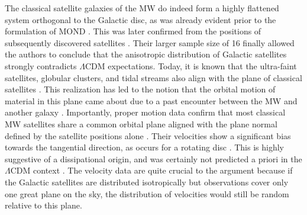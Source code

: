 \documentclass[fleqn,usenatbib,useAMS,onecolumn]{mnras} %
\begin{document}
The classical satellite galaxies of the MW do indeed form a highly flattened system orthogonal to the Galactic disc, as was already evident prior to the formulation of MOND \citep{Lynden_Bell_1976, Lynden_Bell_1982}. This was later confirmed from the positions of subsequently discovered satellites \citep{Kroupa_2005}. Their larger sample size of 16 finally allowed the authors to conclude that the anisotropic distribution of Galactic satellites strongly contradicts $\Lambda$CDM expectations. Today, it is known that the ultra-faint satellites, globular clusters, and tidal streams also align with the plane of classical satellites \citep{Pawlowski_2012}. This realization has led to the notion that the orbital motion of material in this plane came about due to a past encounter between the MW and another galaxy \citep{Pawlowski_2011}. Importantly, proper motion data confirm that most classical MW satellites share a common orbital plane \citep{Pawlowski_2013_VPOS, Pawlowski_2020} aligned with the plane normal defined by the satellite positions alone \citep{Isabel_2020}. Their velocities show a significant bias towards the tangential direction, as occurs for a rotating disc \citep{Cautun_2017, Riley_2019, Hammer_2021}. This is highly suggestive of a dissipational origin, and was certainly not predicted a priori in the $\Lambda$CDM context \citep{Libeskind_2009, Deason_2011}. The velocity data are quite crucial to the argument because if the Galactic satellites are distributed isotropically but observations cover only one great plane on the sky, the distribution of velocities would still be random relative to this plane.
\end{document}
